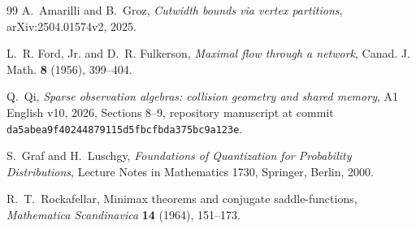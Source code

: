 \begin{thebibliography}{99}
A.~Amarilli and B.~Groz,
\emph{Cutwidth bounds via vertex partitions},
arXiv:2504.01574v2, 2025.

L.~R. Ford, Jr. and D.~R. Fulkerson,
\emph{Maximal flow through a network},
Canad. J. Math. \textbf{8} (1956), 399--404.

Q.~Qi,
\emph{Sparse observation algebras: collision geometry and shared memory},
A1 English v10, 2026, Sections 8--9,
repository manuscript at commit
\texttt{da5abea9f40244879115d5fbcfbda375bc9a123e}.

S.~Graf and H.~Luschgy, \emph{Foundations of Quantization for Probability
Distributions}, Lecture Notes in Mathematics 1730, Springer, Berlin, 2000.

R.~T.~Rockafellar, Minimax theorems and conjugate saddle-functions,
\emph{Mathematica Scandinavica} \textbf{14} (1964), 151--173.
\end{thebibliography}
